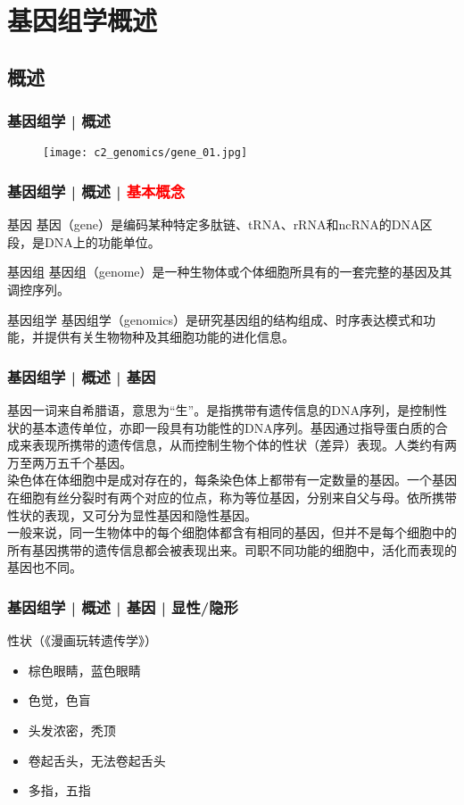 \section{基因组学概述}
\subsection{概述}
\begin{frame}
  \frametitle{基因组学 | 概述}
  \begin{figure}
    \centering
    \texttt{[image: c2\_genomics/gene\_01.jpg]}
  \end{figure}
\end{frame}

\begin{frame}
  \frametitle{基因组学 | 概述 | \textcolor{red}{基本概念}}
  \begin{block}{基因}
基因（gene）是编码某种特定多肽链、tRNA、rRNA和ncRNA的DNA区段，是DNA上的功能单位。
  \end{block}
  \pause
  \begin{block}{基因组}
 基因组（genome）是一种生物体或个体细胞所具有的一套完整的基因及其调控序列。
  \end{block}
  \pause
  \begin{block}{基因组学}
 基因组学（genomics）是研究基因组的结构组成、时序表达模式和功能，并提供有关生物物种及其细胞功能的进化信息。 
  \end{block}
\end{frame}

\begin{frame}
  \frametitle{基因组学 | 概述 | 基因}
基因一词来自希腊语，意思为“生”。是指携带有遗传信息的DNA序列，是控制性状的基本遗传单位，亦即一段具有功能性的DNA序列。基因通过指导蛋白质的合成来表现所携带的遗传信息，从而控制生物个体的性状（差异）表现。人类约有两万至两万五千个基因。\\
\vspace{1em}
染色体在体细胞中是成对存在的，每条染色体上都带有一定数量的基因。一个基因在细胞有丝分裂时有两个对应的位点，称为等位基因，分别来自父与母。依所携带性状的表现，又可分为显性基因和隐性基因。\\
\vspace{1em}
一般来说，同一生物体中的每个细胞体都含有相同的基因，但并不是每个细胞中的所有基因携带的遗传信息都会被表现出来。司职不同功能的细胞中，活化而表现的基因也不同。
\end{frame}

\begin{frame}
  \frametitle{基因组学 | 概述 | 基因 | 显性/隐形}
  \begin{block}{性状（《漫画玩转遗传学》）}
    \begin{itemize}
      \item 棕色眼睛，蓝色眼睛
      \item 色觉，色盲
      \item 头发浓密，秃顶
      \item 卷起舌头，无法卷起舌头
      \item 多指，五指
    \end{itemize}
  \end{block}
\end{frame}

